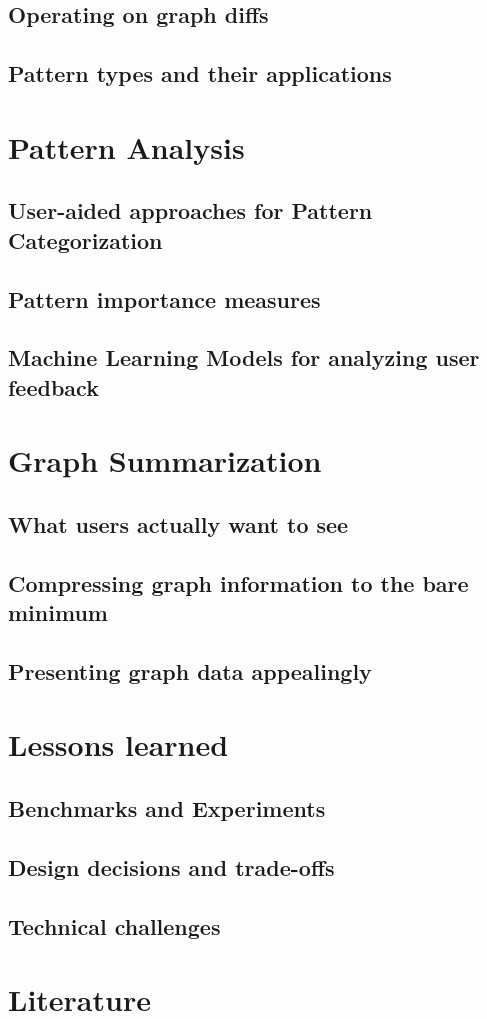 \documentclass[
        a4paper,     %
        titlepage,   %
        twoside,     %
        parskip      %
        ]{scrartcl}  %
\begin{document}
    \subsection{Operating on graph diffs}
    \subsection{Pattern types and their applications}
  \section{Pattern Analysis}
    \subsection{User-aided approaches for Pattern Categorization}
    \subsection{Pattern importance measures}
    \subsection{Machine Learning Models for analyzing user feedback}
  \section{Graph Summarization}
    \subsection{What users actually want to see}
    \subsection{Compressing graph information to the bare minimum}
    \subsection{Presenting graph data appealingly}
  \section{Lessons learned}
    \subsection{Benchmarks and Experiments}
    \subsection{Design decisions and trade-offs}
    \subsection{Technical challenges}

  \section{Literature}

  \clearpage
  
\end{document}
